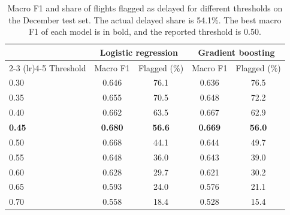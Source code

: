 \begin{table}[ht]
  \centering
  \caption{Macro F1 and share of flights flagged as delayed for different thresholds on the December test set. The actual delayed share is 54.1\%. The best macro F1 of each model is in bold, and the reported threshold is 0.50.}
  \label{tab:threshold}
  \begin{tabular*}{\textwidth}{@{\extracolsep{\fill}}lcccc@{}}
    \toprule
    & \multicolumn{2}{c}{Logistic regression} & \multicolumn{2}{c}{Gradient boosting} \\
    \cmidrule(lr){2-3} \cmidrule(lr){4-5}
    Threshold & Macro F1 & Flagged (\%) & Macro F1 & Flagged (\%) \\
    \midrule
    0.30 & 0.646 & 76.1 & 0.636 & 76.5 \\
    0.35 & 0.655 & 70.5 & 0.648 & 72.2 \\
    0.40 & 0.662 & 63.5 & 0.667 & 62.9 \\
    \textbf{0.45} & \textbf{0.680} & \textbf{56.6} & \textbf{0.669} & \textbf{56.0} \\
    0.50 & 0.668 & 44.1 & 0.644 & 49.7 \\
    0.55 & 0.648 & 36.0 & 0.643 & 39.0 \\
    0.60 & 0.628 & 29.7 & 0.621 & 30.2 \\
    0.65 & 0.593 & 24.0 & 0.576 & 21.1 \\
    0.70 & 0.558 & 18.4 & 0.528 & 15.4 \\
    \bottomrule
  \end{tabular*}
\end{table}
